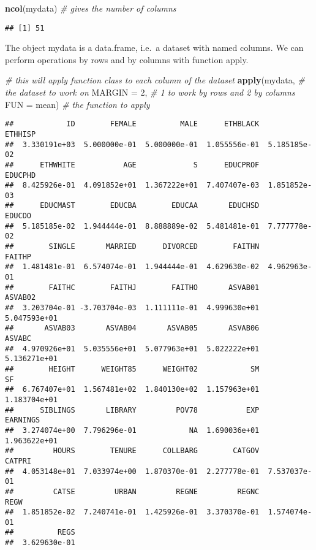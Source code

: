 \documentclass[
]{article}
\newenvironment{Shaded}{\begin{snugshade}}{\end{snugshade}}
\newcommand{\AttributeTok}[1]{\textcolor[rgb]{0.13,0.29,0.53}{#1}}
\newcommand{\CommentTok}[1]{\textcolor[rgb]{0.56,0.35,0.01}{\textit{#1}}}
\newcommand{\DecValTok}[1]{\textcolor[rgb]{0.00,0.00,0.81}{#1}}
\newcommand{\FunctionTok}[1]{\textcolor[rgb]{0.13,0.29,0.53}{\textbf{#1}}}
\newcommand{\NormalTok}[1]{#1}
\begin{document}
\begin{Shaded}
\begin{Highlighting}[]
\FunctionTok{ncol}\NormalTok{(mydata)    }\CommentTok{\# gives the number of columns}
\end{Highlighting}
\end{Shaded}

\begin{verbatim}
## [1] 51
\end{verbatim}

The object mydata is a data.frame, i.e.~a dataset with named columns. We
can perform operations by rows and by columns with function apply.

\begin{Shaded}
\begin{Highlighting}[]
\CommentTok{\# this will apply function class to each column of the dataset}
\FunctionTok{apply}\NormalTok{(mydata,     }\CommentTok{\# the dataset to work on}
      \AttributeTok{MARGIN =} \DecValTok{2}\NormalTok{, }\CommentTok{\# 1 to work by rows and 2 by columns}
      \AttributeTok{FUN =}\NormalTok{ mean) }\CommentTok{\# the function to apply}
\end{Highlighting}
\end{Shaded}

\begin{verbatim}
##            ID        FEMALE          MALE      ETHBLACK       ETHHISP 
##  3.330191e+03  5.000000e-01  5.000000e-01  1.055556e-01  5.185185e-02 
##      ETHWHITE           AGE             S      EDUCPROF       EDUCPHD 
##  8.425926e-01  4.091852e+01  1.367222e+01  7.407407e-03  1.851852e-03 
##      EDUCMAST        EDUCBA        EDUCAA       EDUCHSD        EDUCDO 
##  5.185185e-02  1.944444e-01  8.888889e-02  5.481481e-01  7.777778e-02 
##        SINGLE       MARRIED      DIVORCED        FAITHN        FAITHP 
##  1.481481e-01  6.574074e-01  1.944444e-01  4.629630e-02  4.962963e-01 
##        FAITHC        FAITHJ        FAITHO       ASVAB01       ASVAB02 
##  3.203704e-01 -3.703704e-03  1.111111e-01  4.999630e+01  5.047593e+01 
##       ASVAB03       ASVAB04       ASVAB05       ASVAB06        ASVABC 
##  4.970926e+01  5.035556e+01  5.077963e+01  5.022222e+01  5.136271e+01 
##        HEIGHT      WEIGHT85      WEIGHT02            SM            SF 
##  6.767407e+01  1.567481e+02  1.840130e+02  1.157963e+01  1.183704e+01 
##      SIBLINGS       LIBRARY         POV78           EXP      EARNINGS 
##  3.274074e+00  7.796296e-01            NA  1.690036e+01  1.963622e+01 
##         HOURS        TENURE      COLLBARG        CATGOV        CATPRI 
##  4.053148e+01  7.033974e+00  1.870370e-01  2.277778e-01  7.537037e-01 
##         CATSE         URBAN         REGNE         REGNC          REGW 
##  1.851852e-02  7.240741e-01  1.425926e-01  3.370370e-01  1.574074e-01 
##          REGS 
##  3.629630e-01
\end{verbatim}
\end{document}
